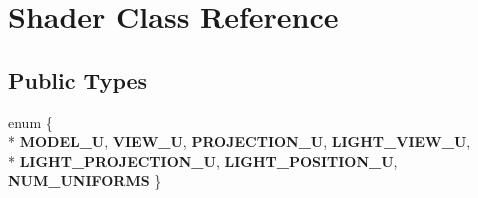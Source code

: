 \hypertarget{classShader}{\section{Shader Class Reference}
\label{classShader}
}
\subsection*{Public Types}
\begin{DoxyCompactItemize}
\item 
enum \{ \\*
{\bfseries M\-O\-D\-E\-L\-\_\-\-U}, 
{\bfseries V\-I\-E\-W\-\_\-\-U}, 
{\bfseries P\-R\-O\-J\-E\-C\-T\-I\-O\-N\-\_\-\-U}, 
{\bfseries L\-I\-G\-H\-T\-\_\-\-V\-I\-E\-W\-\_\-\-U}, 
\\*
{\bfseries L\-I\-G\-H\-T\-\_\-\-P\-R\-O\-J\-E\-C\-T\-I\-O\-N\-\_\-\-U}, 
{\bfseries L\-I\-G\-H\-T\-\_\-\-P\-O\-S\-I\-T\-I\-O\-N\-\_\-\-U}, 
{\bfseries N\-U\-M\-\_\-\-U\-N\-I\-F\-O\-R\-M\-S}
 \}
\end{DoxyCompactItemize}
